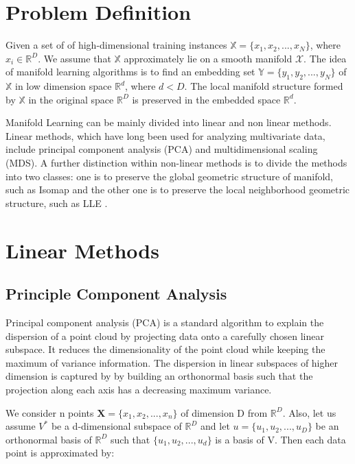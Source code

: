 \section{Problem Definition}
Given a set of of high-dimensional training instances $\mathbb{X} = \{x_1, x_2, ...,x_N \}$, where $x_{i} \in \mathbb{R}^D$. We assume that $\mathbb{X}$ approximately lie on a smooth manifold $\mathcal{X}$. The idea of manifold learning algorithms is to find an embedding set $\mathbb{Y} = \{y_1, y_2, ...,y_N \} $ of $\mathbb{X}$ in low dimension space $\mathbb{R}^d$, where $d<D$. The local manifold structure formed by $\mathbb{X}$ in the original space $\mathbb{R}^D$ is preserved in the embedded space $\mathbb{R}^d$.


Manifold Learning can be mainly divided into linear and non linear methods.
Linear methods, which have long been used for analyzing multivariate data, include principal component analysis (PCA) and multidimensional scaling (MDS). A further distinction within non-linear methods is to divide the methods into two classes: one is to preserve the global geometric structure of manifold, such as Isomap \citep{Tene2000} and the other one is to preserve the local neighborhood geometric structure, such as LLE \citep{Roweis2000}.

\section{Linear Methods}
\subsection{Principle Component Analysis}
\label{s:pca}

Principal component analysis (PCA) is a standard algorithm to explain the dispersion of a point cloud by projecting data onto a carefully chosen linear subspace. It reduces the dimensionality of the point cloud while keeping the maximum of variance information. The dispersion in linear subspaces of higher dimension is captured by by building an orthonormal basis such that the projection along each axis has a decreasing maximum variance. 

We consider n points $\mathbf{X} = \{x_1, x_2, ..., x_n\}$ of dimension D from $\mathbb{R}^D$. Also, let us assume $V^{*}$ be a d-dimensional subspace of $\mathbb{R}^D$ and let $ u = \{u_1, u_2, ..., u_D\}$ be an orthonormal basis of $\mathbb{R}^D$ such that $\{u_1, u_2, ..., u_d\}$ is a basis of V. Then each data point is approximated by:

